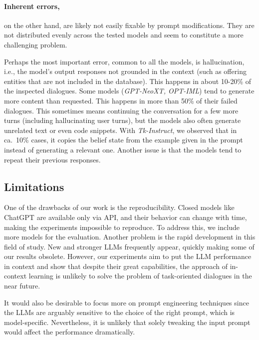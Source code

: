 \paragraph{Inherent errors,} on the other hand, are likely not easily fixable by prompt modifications.
They are not distributed evenly across the tested models and seem to constitute a more challenging problem.

Perhaps the most important error, common to all the models, is hallucination, i.e., the model's output responses not grounded in the context (such as offering entities that are not included in the database). This happens in about 10-20\% of the inspected dialogues.
Some models (\emph{GPT-NeoXT, OPT-IML}) tend to generate more content than requested.
This happens in more than 50\% of their failed dialogues.
This sometimes means continuing the conversation for a few more turns (including hallucinating user turns), but the models also often generate unrelated text or even code snippets.
With \emph{Tk-Instruct}, we observed that in ca.~10\% cases, it copies the belief state from the example given in the prompt instead of generating a relevant one.
Another issue is that the models tend to repeat their previous responses.

\subsection{Limitations}
One of the drawbacks of our work is the reproducibility.
Closed models like ChatGPT are available only via API, and their behavior can change with time, making the experiments impossible to reproduce.
To address this, we include more models for the evaluation.
Another problem is the rapid development in this field of study.
New and stronger LLMs frequently appear, quickly making some of our results obsolete.
However, our experiments aim to put the LLM performance in context and show that despite their great capabilities, the approach of in-context learning is unlikely to solve the problem of task-oriented dialogues in the near future.

It would also be desirable to focus more on prompt engineering techniques since the LLMs are arguably sensitive to the choice of the right prompt, which is model-specific.
Nevertheless, it is unlikely that solely tweaking the input prompt would affect the performance dramatically.

